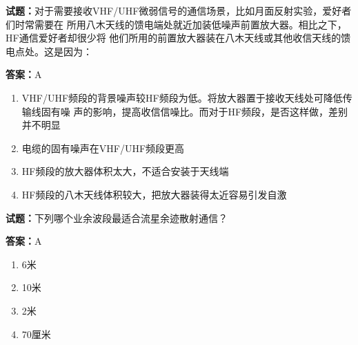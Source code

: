 \documentclass{ctexbook}
\begin{document}




\vspace{1em}

\textbf{试题：}对于需要接收VHF/UHF微弱信号的通信场景，比如月面反射实验，爱好者们时常需要在
所用八木天线的馈电端处就近加装低噪声前置放大器。相比之下，HF通信爱好者却很少将
他们所用的前置放大器装在八木天线或其他收信天线的馈电点处。这是因为： 

\textbf{答案：}A 

\begin{enumerate}[leftmargin=3em]
  \item VHF/UHF频段的背景噪声较HF频段为低。将放大器置于接收天线处可降低传输线固有噪
声的影响，提高收信信噪比。而对于HF频段，是否这样做，差别并不明显 

  \item 电缆的固有噪声在VHF/UHF频段更高 

  \item HF频段的放大器体积太大，不适合安装于天线端 

  \item HF频段的八木天线体积较大，把放大器装得太近容易引发自激 

\end{enumerate}





\vspace{1em}

\textbf{试题：}下列哪个业余波段最适合流星余迹散射通信？ 

\textbf{答案：}A 

\begin{enumerate}[leftmargin=3em]
  \item 6米 

  \item 10米 

  \item 2米 

  \item 70厘米 

\end{enumerate}






\vspace{1em}
\end{document}
